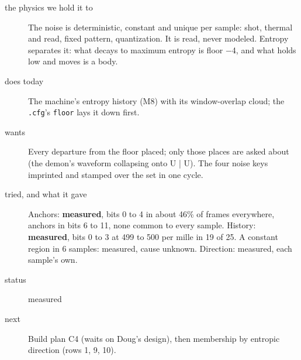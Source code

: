\begin{description}
\item[{the physics we hold it to}] The noise is deterministic, constant and unique per sample: shot, thermal and read, fixed pattern, quantization. It is read, never modeled. Entropy separates it: what decays to maximum entropy is floor −4, and what holds low and moves is a body.
\item[{does today}] The machine's entropy history (M8) with its window-overlap cloud; the \texttt{.\allowbreak{}cfg}'s \texttt{floor} lays it down first.
\item[{wants}] Every departure from the floor placed; only those places are asked about (the demon's waveform collapsing onto U | U). The four noise keys imprinted and stamped over the set in one cycle.
\item[{tried, and what it gave}] Anchors: \textbf{measured}, bits 0 to 4 in about 46\% of frames everywhere, anchors in bits 6 to 11, none common to every sample. History: \textbf{measured}, bits 0 to 3 at 499 to 500 per mille in 19 of 25. A constant region in 6 samples: measured, cause unknown. Direction: measured, each sample's own.
\item[{status}] measured
\item[{next}] Build plan C4 (waits on Doug's design), then membership by entropic direction (rows 1, 9, 10).
\end{description}

